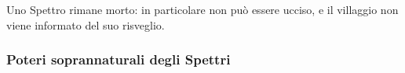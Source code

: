 \documentclass[a4paper,10pt]{article}
\begin{document}
\begin{itemize}
 Uno Spettro rimane morto: in particolare non può essere ucciso, e il villaggio non viene informato del suo risveglio.
 
 
\end{itemize}


\subsubsection*{Poteri soprannaturali degli Spettri}
\end{document}
